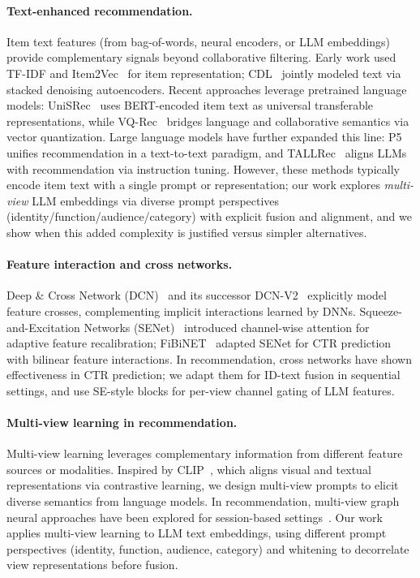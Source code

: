 \documentclass[sigconf,natbib=true,anonymous]{acmart}
\newcommand{\llm}{\textsc{LLM}\xspace}
\begin{document}
\paragraph{Text-enhanced recommendation.}
Item text features (from bag-of-words, neural encoders, or
\llm embeddings) provide complementary signals beyond
collaborative filtering. Early work used TF-IDF and
Item2Vec~\cite{barkan2016item2vec} for item representation;
CDL~\cite{wang2015cdl} jointly modeled text via stacked
denoising autoencoders. Recent approaches leverage pretrained
language models: UniSRec~\cite{hou2022unisrec} uses
BERT-encoded item text as universal transferable
representations, while VQ-Rec~\cite{hou2023vqrec} bridges
language and collaborative semantics via vector quantization.
Large language models have further expanded this line:
P5~\cite{geng2022p5} unifies recommendation in a text-to-text
paradigm, and TALLRec~\cite{bao2023tallrec} aligns LLMs with
recommendation via instruction tuning. However, these methods
typically encode item text with a single prompt or
representation; our work explores \emph{multi-view} \llm
embeddings via diverse prompt perspectives
(identity/function/audience/category) with explicit fusion and
alignment, and we show when this added complexity is justified
versus simpler alternatives.

\paragraph{Feature interaction and cross networks.}
Deep \& Cross Network (DCN)~\cite{wang2017dcn} and its
successor DCN-V2~\cite{wang2021dcnv2} explicitly model feature
crosses, complementing implicit interactions learned by DNNs.
Squeeze-and-Excitation Networks (SENet)~\cite{hu2018senet}
introduced channel-wise attention for adaptive feature
recalibration; FiBiNET~\cite{huang2019fibinet} adapted SENet
for CTR prediction with bilinear feature interactions. In
recommendation, cross networks have shown effectiveness in CTR
prediction; we adapt them for ID-text fusion in sequential
settings, and use SE-style blocks for per-view channel gating of \llm
features.

\paragraph{Multi-view learning in recommendation.}
Multi-view learning leverages complementary information from
different feature sources or modalities. Inspired by
CLIP~\cite{radford2021clip}, which aligns visual and textual
representations via contrastive learning, we design multi-view
prompts to elicit diverse semantics from language models. In
recommendation, multi-view graph neural approaches have been explored for
session-based settings~\cite{huang2025mvcgnn_session}. Our work applies
multi-view learning to \llm text embeddings, using different
prompt perspectives (identity, function, audience, category)
and whitening to decorrelate view representations before
fusion.
\end{document}
